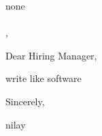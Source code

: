 \documentclass[11pt,a4paper]{letter}
\begin{document}
\begin{letter}{
none\\
\\
, 
}

\address{
nilay\\
\\
, \\
9016989674\\
\href{mailto:nilaypatel@gmail.com}{nilaypatel@gmail.com}
}

\date{April 14, 2025}

\opening{Dear Hiring Manager,}

write like software



\closing{Sincerely,}

\vspace{0.5in}
nilay

\end{letter}
\end{document}
